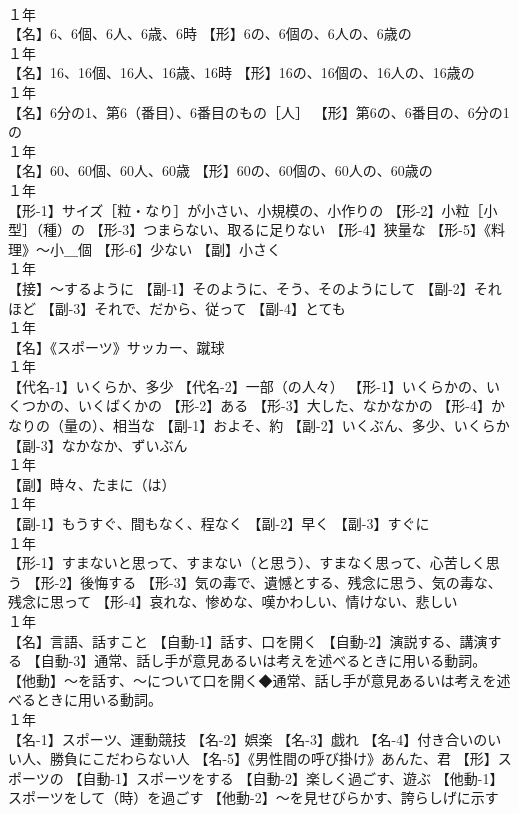\documentclass[8pt]{extreport}
\begin{document}
\begin{CJK}{UTF8}{min}
\\	１年	
\\	【名】6、6個、6人、6歳、6時 【形】6の、6個の、6人の、6歳の
\\	１年	
\\	【名】16、16個、16人、16歳、16時 【形】16の、16個の、16人の、16歳の
\\	１年	
\\	【名】6分の1、第6（番目）、6番目のもの［人］ 【形】第6の、6番目の、6分の1の
\\	１年	
\\	【名】60、60個、60人、60歳 【形】60の、60個の、60人の、60歳の
\\	１年	
\\	【形-1】サイズ［粒・なり］が小さい、小規模の、小作りの 【形-2】小粒［小型］（種）の 【形-3】つまらない、取るに足りない 【形-4】狭量な 【形-5】《料理》～小＿個 【形-6】少ない 【副】小さく
\\	１年	
\\	【接】～するように 【副-1】そのように、そう、そのようにして 【副-2】それほど 【副-3】それで、だから、従って 【副-4】とても
\\	１年	
\\	【名】《スポーツ》サッカー、蹴球
\\	１年	
\\	【代名-1】いくらか、多少 【代名-2】一部（の人々） 【形-1】いくらかの、いくつかの、いくばくかの 【形-2】ある 【形-3】大した、なかなかの 【形-4】かなりの（量の）、相当な 【副-1】およそ、約 【副-2】いくぶん、多少、いくらか 【副-3】なかなか、ずいぶん
\\	１年	
\\	【副】時々、たまに（は）
\\	１年	
\\	【副-1】もうすぐ、間もなく、程なく 【副-2】早く 【副-3】すぐに
\\	１年	
\\	【形-1】すまないと思って、すまない（と思う）、すまなく思って、心苦しく思う 【形-2】後悔する 【形-3】気の毒で、遺憾とする、残念に思う、気の毒な、残念に思って 【形-4】哀れな、惨めな、嘆かわしい、情けない、悲しい
\\	１年	
\\	【名】言語、話すこと 【自動-1】話す、口を開く 【自動-2】演説する、講演する 【自動-3】通常、話し手が意見あるいは考えを述べるときに用いる動詞。 【他動】～を話す、～について口を開く◆通常、話し手が意見あるいは考えを述べるときに用いる動詞。
\\	１年	
\\	【名-1】スポーツ、運動競技 【名-2】娯楽 【名-3】戯れ 【名-4】付き合いのいい人、勝負にこだわらない人 【名-5】《男性間の呼び掛け》あんた、君 【形】スポーツの 【自動-1】スポーツをする 【自動-2】楽しく過ごす、遊ぶ 【他動-1】スポーツをして（時）を過ごす 【他動-2】～を見せびらかす、誇らしげに示す

\end{CJK}
\end{document}

